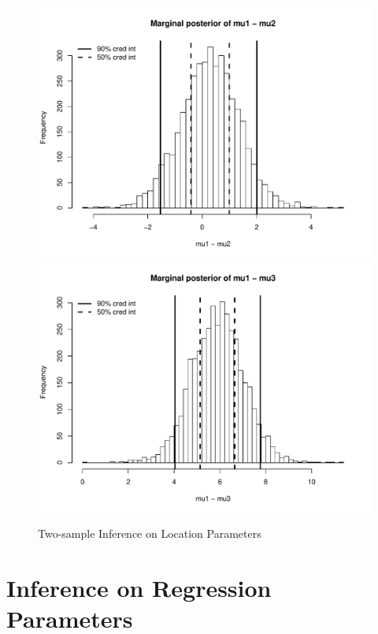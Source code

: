 \documentclass[12pt]{article}
\begin{document}
\begin{figure}[H]\caption[]{Two-sample Inference on Location Parameters}
\begin{minipage}{1\linewidth}
  \centering
\includegraphics[trim={0cm 0cm 0cm 0cm}, clip, scale=0.4]{../figs/norm2.pdf}
\includegraphics[trim={0cm 0cm 0cm 0cm}, clip, scale=0.4]{../figs/norm3.pdf}
\footnotesize
\end{minipage}
\end{figure}

\section{Inference on Regression Parameters}
\end{document}
